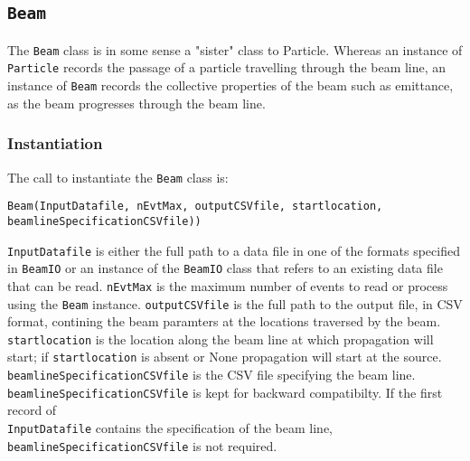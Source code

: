 \vfill
\pagebreak

\subsection{\texttt{Beam}}
\label{SubSect:B}

The \texttt{Beam} class is in some sense a "sister" class to Particle.
Whereas an instance of \texttt{Particle} records the passage of a
particle travelling through the   beam line, an instance
of \texttt{Beam} records the collective properties of the beam such as
emittance, as the beam progresses through the beam line. 

\subsubsection{Instantiation}
The call to instantiate the \texttt{Beam} class is:
\begin{center}
  \texttt{Beam(InputDatafile, nEvtMax, outputCSVfile,
  startlocation, beamlineSpecificationCSVfile))}
\end{center}
\texttt{InputDatafile} is either the full path to a data file in one
of the formats specified in \texttt{BeamIO} or an instance of
the \texttt{BeamIO} class that refers to an existing data file that
can be read.
\texttt{nEvtMax} is the maximum number of events to read or process
using the \texttt{Beam} instance.
\texttt{outputCSVfile} is the full path to the output file, in CSV
format, contining the beam paramters at the locations traversed by the
beam. 
\texttt{startlocation} is the location along the beam line at which
propagation will start; if \texttt{startlocation} is absent or None
propagation will start at the source.
\texttt{beamlineSpecificationCSVfile} is the CSV file specifying the
beam line. \\
\texttt{beamlineSpecificationCSVfile} is kept for backward
compatibilty.
If the first record of \\
\texttt{InputDatafile} contains the specification of the beam
line, \texttt{beamlineSpecificationCSVfile} is not required. 

